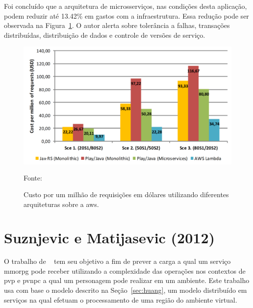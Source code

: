 Foi concluído que a arquitetura de microsserviços, nas condições desta aplicação, podem reduzir até 13.42\% em gastos com a infraestrutura.
%
Essa redução pode ser observada na Figura~\ref{fig:custo_aws}.
%
O autor alerta sobre tolerância a falhas, transações distribuídas, distribuição de dados e controle de versões de serviço.

\begin{figure}[htb!]
\caption{Custo por um milhão de requisições em dólares utilizando diferentes arquiteturas sobre a \ac{aws}.}
\label{fig:custo_aws}
\includegraphics[width=.8\textwidth]{img/cap2/custo_aws.png}
\centering

Fonte:~\cite{7515686}
\end{figure}


\section{Suznjevic e Matijasevic (2012)}



O trabalho de ~\cite{6374456} tem seu objetivo a fim de prever a carga a qual um serviço \ac{mmorpg} pode receber utilizando a complexidade das operações nos contextos de \ac{pvp} e \ac{pvnpc} a qual um personagem pode realizar em um ambiente.
%
Este trabalho usa com base o modelo descrito na Seção~\ref{sec:huang}, um modelo distribuído em serviços na qual efetuam o processamento de uma região do ambiente virtual.



